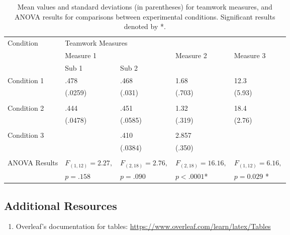 \begin{center}
\begin{table*}[b!]
\small
\begin{center}
\begin{tabular}{l l l l l}
\toprule
Condition & \multicolumn{4}{l}{Teamwork Measures}\\
\cmidrule(r){2-5}
& \multicolumn{2}{l}{Measure 1} & Measure 2 & Measure 3 \\
\cmidrule(r){2-3} 
&  Sub 1 & Sub 2 &  \\ 


\midrule


Condition 1 & .478 & .468 & 1.68 & 12.3  \\
                  & (.0259) & (.031) & (.703) & (5.93) \\
\\

Condition 2 & .444 & .451 & 1.32 & 18.4 \\
                              & (.0478) & (.0585) & (.319) & (2.76) \\
\\

Condition 3 &  & .410 &  2.857 &  \\
                     &        & (.0384)  & (.350) & \\
\\


ANOVA Results & $F_{(1,12)} = 2.27,$ & $F_{(2,18)} = 2.76,$  & $F_{(2,18)} = 16.16,$ & $F_{(1,12)} = 6.16,$ \\
                          & $p = .158$ & $p = .090  $ &  $p < .0001$* &  $p = 0.029$ * \\
\bottomrule
\end{tabular}

\caption[a]{Mean values and standard deviations (in parentheses) for teamwork measures, and ANOVA results for comparisons between experimental conditions. Significant results denoted by *.}
\label{tab:exampletable}
\end{center}
\end{table*}
\end{center}

\subsection*{Additional Resources}
\begin{enumerate}
    \item Overleaf's documentation for tables: \href{https://www.overleaf.com/learn/latex/Tables}{https://www.overleaf.com/learn/latex/Tables}
\end{enumerate}